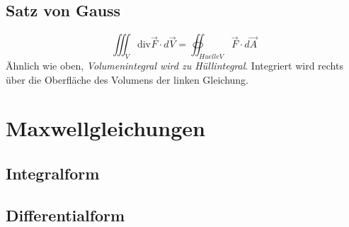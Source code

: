 \documentclass[11pt, a4paper]{article}
\begin{document}
\begin{figure}[H]
\centering
{}
\end{figure}

\begin{figure}[H]
\centering
{}
\end{figure}


\subsection{Satz von Gauss}
\[\iiint_{V}{\text{div}\vec{F} \cdot d\vec{V}} = \oiint_{Huelle V}{\vec{F} \cdot d\vec{A}}\]
Ähnlich wie oben, \emph{Volumenintegral wird zu Hüllintegral}. Integriert wird rechts über die Oberfläche des Volumens der linken Gleichung.

\section{Maxwellgleichungen}






\subsection{Integralform}
\subsection{Differentialform}

\end{document}
